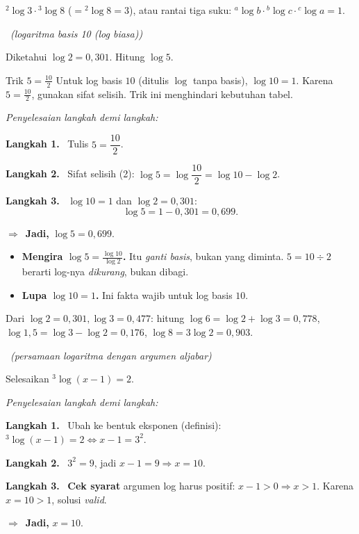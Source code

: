 \documentclass[11pt,a4paper]{report}
\theoremstyle{gaya}
\newcommand{\jawab}{\par\smallskip\noindent\textit{\textcolor{oranye}{Penyelesaian langkah demi langkah:}}\par\smallskip}
\newcommand{\langkah}[1]{\par\smallskip\noindent\textbf{\textcolor{biru}{Langkah #1.}}\ }
\newcommand{\jadi}{\par\smallskip\noindent$\Rightarrow$\ \textbf{Jadi, }}
\newcommand{\soalno}[2]{%
  \par\bigskip
  \noindent{\large\bfseries\color{ungu}\rule[-2pt]{4pt}{14pt}\ Soal #1}%
  \ {\normalfont\itshape\color{gray}(#2)}\par\nopagebreak\smallskip}
\begin{document}
\begin{variasi}
${}^{2}\!\log3\cdot{}^{3}\!\log8$ ($={}^{2}\!\log8=3$), atau rantai tiga suku:
${}^{a}\!\log b\cdot{}^{b}\!\log c\cdot{}^{c}\!\log a = 1$.
\end{variasi}

\soalno{1.3.7}{logaritma basis 10 (log biasa)}
\begin{soalbox}{}
Diketahui $\log 2 = 0{,}301$. Hitung $\log 5$.
\end{soalbox}

\begin{ingat}{Trik $5 = \tfrac{10}{2}$}
Untuk log basis $10$ (ditulis $\log$ tanpa basis), $\log10=1$. Karena
$5=\frac{10}{2}$, gunakan sifat selisih. Trik ini menghindari kebutuhan tabel.
\end{ingat}

\jawab
\langkah{1} Tulis $5=\dfrac{10}{2}$.
\langkah{2} Sifat selisih (2): $\log5 = \log\dfrac{10}{2} = \log10 - \log2$.
\langkah{3} $\log10=1$ dan $\log2=0{,}301$:
\[
\log5 = 1 - 0{,}301 = 0{,}699.
\]
\jadi $\log5 = 0{,}699$.

\begin{jebakan}
\begin{itemize}[leftmargin=*,topsep=2pt]
  \item \textbf{Mengira $\log5=\tfrac{\log10}{\log2}$.} Itu \emph{ganti basis},
  bukan yang diminta. $5=10\div2$ berarti log-nya \emph{dikurang}, bukan dibagi.
  \item \textbf{Lupa $\log10=1$.} Ini fakta wajib untuk log basis $10$.
\end{itemize}
\end{jebakan}

\begin{variasi}
Dari $\log2=0{,}301,\log3=0{,}477$: hitung $\log6=\log2+\log3=0{,}778$,
$\log 1{,}5=\log3-\log2=0{,}176$, $\log 8 = 3\log2=0{,}903$.
\end{variasi}

\soalno{1.3.8}{persamaan logaritma dengan argumen aljabar}
\begin{soalbox}{}
Selesaikan ${}^{3}\!\log(x-1) = 2$.
\end{soalbox}

\jawab
\langkah{1} Ubah ke bentuk eksponen (definisi): ${}^{3}\!\log(x-1)=2 \iff
x-1 = 3^2$.
\langkah{2} $3^2 = 9$, jadi $x-1=9 \Rightarrow x=10$.
\langkah{3} \textbf{Cek syarat} argumen log harus positif: $x-1>0 \Rightarrow
x>1$. Karena $x=10>1$, solusi \emph{valid}.
\jadi $x=10$.
\end{document}
